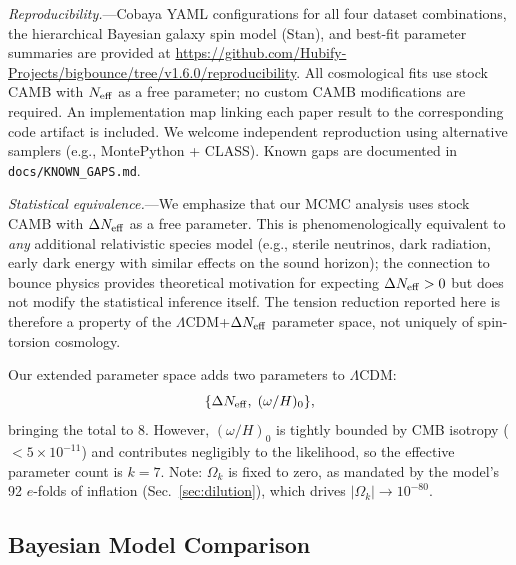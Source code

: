 \documentclass[aps,prd,twocolumn,superscriptaddress,showpacs,preprintnumbers,nofootinbib,longbibliography,floatfix]{revtex4-2}
\newcommand{\Neff}{N_{\rm eff}}
\begin{document}
\textit{Reproducibility.}---Cobaya YAML configurations for all four dataset combinations, the hierarchical Bayesian galaxy spin model (Stan), and best-fit parameter summaries are provided at \url{https://github.com/Hubify-Projects/bigbounce/tree/v1.6.0/reproducibility}. All cosmological fits use stock CAMB with $\Neff$ as a free parameter; no custom CAMB modifications are required. An implementation map linking each paper result to the corresponding code artifact is included. We welcome independent reproduction using alternative samplers (e.g., MontePython + CLASS). Known gaps are documented in \texttt{docs/KNOWN\_GAPS.md}.

\textit{Statistical equivalence.}---We emphasize that our MCMC analysis uses stock CAMB with $\Delta\Neff$ as a free parameter. This is phenomenologically equivalent to \textit{any} additional relativistic species model (e.g., sterile neutrinos, dark radiation, early dark energy with similar effects on the sound horizon); the connection to bounce physics provides theoretical motivation for expecting $\Delta\Neff > 0$ but does not modify the statistical inference itself. The tension reduction reported here is therefore a property of the $\Lambda$CDM+$\Delta\Neff$ parameter space, not uniquely of spin-torsion cosmology.

Our extended parameter space adds two parameters to $\Lambda$CDM:
\begin{equation}
\{\Delta\Neff,\;(\omega/H)_0\},
\end{equation}
bringing the total to 8. However, $(\omega/H)_0$ is tightly bounded by CMB isotropy ($< 5\times 10^{-11}$) and contributes negligibly to the likelihood, so the effective parameter count is $k=7$. Note: $\Omega_k$ is fixed to zero, as mandated by the model's 92 $e$-folds of inflation (Sec.~\ref{sec:dilution}), which drives $|\Omega_k| \to 10^{-80}$.

\subsection{Bayesian Model Comparison}
\end{document}
